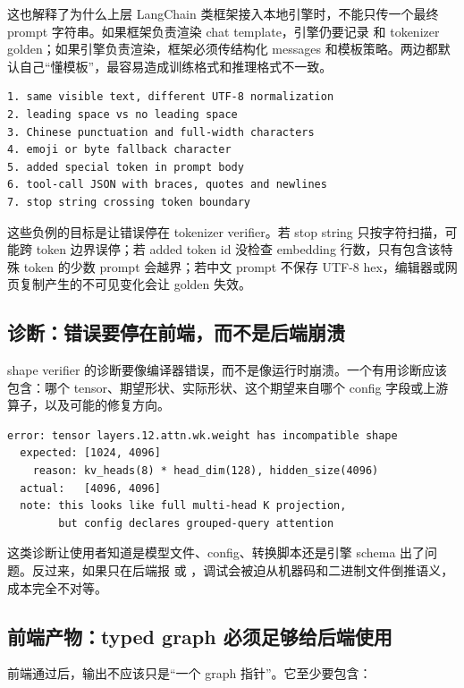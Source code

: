 这也解释了为什么上层 LangChain 类框架接入本地引擎时，不能只传一个最终 prompt 字符串。如果框架负责渲染 chat template，引擎仍要记录  和 tokenizer golden；如果引擎负责渲染，框架必须传结构化 messages 和模板策略。两边都默认自己“懂模板”，最容易造成训练格式和推理格式不一致。

\begin{lstlisting}[numbers=none,caption={tokenizer 负例应覆盖的输入}]
1. same visible text, different UTF-8 normalization
2. leading space vs no leading space
3. Chinese punctuation and full-width characters
4. emoji or byte fallback character
5. added special token in prompt body
6. tool-call JSON with braces, quotes and newlines
7. stop string crossing token boundary
\end{lstlisting}

这些负例的目标是让错误停在 tokenizer verifier。若 stop string 只按字符扫描，可能跨 token 边界误停；若 added token id 没检查 embedding 行数，只有包含该特殊 token 的少数 prompt 会越界；若中文 prompt 不保存 UTF-8 hex，编辑器或网页复制产生的不可见变化会让 golden 失效。

\subsection{诊断：错误要停在前端，而不是后端崩溃}

shape verifier 的诊断要像编译器错误，而不是像运行时崩溃。一个有用诊断应该包含：哪个 tensor、期望形状、实际形状、这个期望来自哪个 config 字段或上游算子，以及可能的修复方向。

\begin{lstlisting}[numbers=none,caption={好的模型导入诊断示例}]
error: tensor layers.12.attn.wk.weight has incompatible shape
  expected: [1024, 4096]
    reason: kv_heads(8) * head_dim(128), hidden_size(4096)
  actual:   [4096, 4096]
  note: this looks like full multi-head K projection,
        but config declares grouped-query attention
\end{lstlisting}

这类诊断让使用者知道是模型文件、config、转换脚本还是引擎 schema 出了问题。反过来，如果只在后端报  或 ，调试会被迫从机器码和二进制文件倒推语义，成本完全不对等。

\subsection{前端产物：typed graph 必须足够给后端使用}

前端通过后，输出不应该只是“一个 graph 指针”。它至少要包含：

